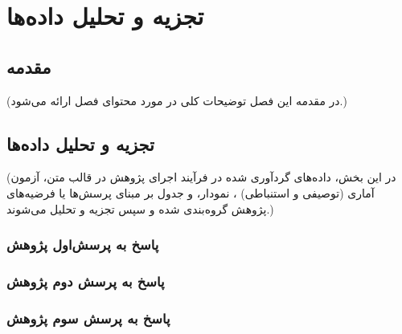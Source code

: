 \chapter{تجزیه و تحلیل داده‌ها}

\section{مقدمه}
(در مقدمه این فصل توضیحات کلی در مورد محتوای فصل ارائه می‌شود.)
\section{تجزیه و تحلیل داده‌ها}
(در این بخش، داده‌های گردآوری شده در فرآیند اجرای پژوهش در قالب متن، آزمون آماری (توصیفی و استنباطی) ، نمودار، و جدول بر مبنای پرسش‌ها یا فرضیه‌های پژوهش گروه‌بندی شده و سپس تجزیه و تحلیل می‌شوند.)
\subsection{پاسخ به پرسش‌اول پژوهش}
\subsection{پاسخ به پرسش‌ دوم پژوهش}
\subsection{پاسخ به پرسش‌ سوم پژوهش}



